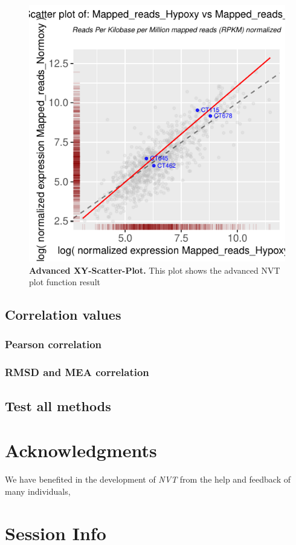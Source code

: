 \documentclass[11pt]{article}\usepackage[]{graphicx}\usepackage[]{color}
\newcommand{\nvt}{\textit{NVT}}
\begin{document}
\begin{figure}
\centering
\includegraphics[width=.8\textwidth]{figure/advancedplot-1}
\caption{
  \textbf{Advanced XY-Scatter-Plot.}
  This plot shows the advanced NVT plot function result}
\label{fig:MA}
\end{figure}

\subsection{Correlation values}

\subsubsection{Pearson correlation}

\subsubsection{RMSD and MEA correlation}

\subsection{Test all methods}


\section{Acknowledgments}

We have benefited in the development of \nvt{} from the help and
feedback of many individuals,
\section{Session Info}


\end{document}
